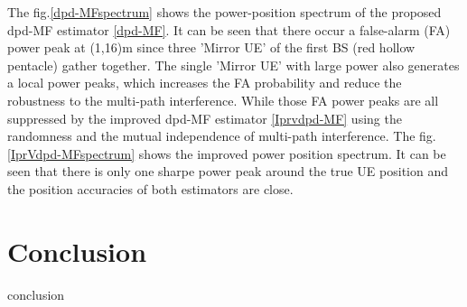 \documentclass[journal]{IEEEtran}
\begin{document}
The fig.\ref{dpd-MFspectrum} shows the power-position spectrum of the proposed dpd-MF estimator \eqref{dpd-MF}. It can be seen that there occur a false-alarm (FA) power peak at (1,16)m since three 'Mirror UE' of the first BS (red hollow pentacle) gather together. The single 'Mirror UE' with large power also generates a local power peaks, which increases the FA probability and reduce the robustness to the multi-path interference. While those FA power peaks are all suppressed by the improved dpd-MF estimator \eqref{Iprvdpd-MF} using the randomness and the mutual independence of multi-path interference. The fig.\ref{IprVdpd-MFspectrum} shows the improved power position spectrum. It can be seen that there is only one sharpe power peak around the true UE position and the position accuracies of both estimators are close. 
\section{Conclusion}
\label{sec:conclusion}
conclusion






\balance



\end{document}
